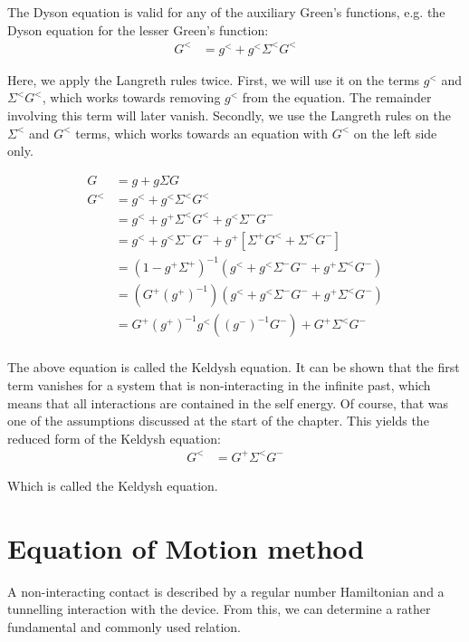 The Dyson equation is valid for any of the auxiliary Green's functions, e.g. the Dyson equation for the lesser Green's function:
\begin{align*}
G^< &= g^< + g^< \Sigma^< G^<  
\end{align*}

Here, we apply the Langreth rules twice. First, we will use it on the terms $g^<$ and $\Sigma^< G^<$, which works towards removing $g^<$ from the equation. The remainder involving this term will later vanish. Secondly, we use the Langreth rules on the $\Sigma^<$ and $G^<$ terms, which works towards an equation with $G^<$ on the left side only.


\begin{align*}
G &= g + g\Sigma G \\
G^< &= g^<  + g^< \Sigma^< G^< \\
 &= g^<  + g^+ \Sigma^< G^< + g^< \Sigma^- G^- \\
 &= g^<  + g^< \Sigma^- G^- + g^+ \left[ \Sigma^+ G^< + \Sigma^< G^- \right]\\
 &= (1 - g^+ \Sigma^+)^{-1} \left( g^<  + g^< \Sigma^- G^- + g^+ \Sigma^< G^-\right) \\
 &= \left(G^+ (g^+)^{-1}\right)\left( g^<  + g^< \Sigma^- G^- + g^+ \Sigma^< G^-\right) \\ 
&= G^+ (g^+)^{-1} g^< \left((g^-)^{-1}G^-  \right) + G^+  \Sigma^< G^- \\
\end{align*}

The above equation is called the Keldysh equation. It can be shown that the first term vanishes for a system that is non-interacting in the infinite past, which means that all interactions are contained in the self energy. Of course, that was one of the assumptions discussed at the start of the chapter. This yields the reduced form of the Keldysh equation:
\begin{align*}
G^< &=  G^+ \Sigma^< G^- 
\end{align*}

Which is called the Keldysh equation.
 

\section{Equation of Motion method}
\label{sec:eommethod}
A non-interacting contact is described by a regular number Hamiltonian and a tunnelling interaction with the device. From this, we can determine a rather fundamental and commonly used relation. 

